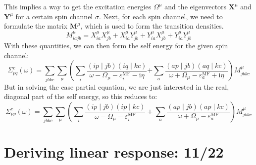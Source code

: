 This implies a way to get the excitation energies $\Omega^\mu$ and the eigenvectors $\mathbf{X}^\mu$ and $\mathbf{Y}^\mu$ for a certain spin channel $\sigma $. Next, for each spin channel, we need to formulate the matrix $\mathbf{M}^{\mu }$, which is used to form the transition densities.
\begin{equation}
M_{i a j b}^{\mu }=X_{i a}^{\mu } X_{j b}^{\mu }+X_{i a}^{\mu } Y_{j b}^{\mu }+Y_{i a}^{\mu } X_{j b}^{\mu }+Y_{i a}^{\mu } Y_{j b}^{\mu }
\end{equation}
With these quantities, we can then form the self energy for the given spin channel:
\begin{equation}
\Sigma_{p q}^c\left(\omega \right)= \sum_{j b k c} \sum_{\mu }\left(\sum_i \frac{(i p \mid j b)(i q \mid k c)}{\omega -\Omega_{\mu }-\varepsilon_i^{\mathrm{MF}}-\mathrm{i} \eta}\right.
\left.+\sum_a \frac{(a p \mid j b)(a q \mid k c)}{\omega +\Omega_{\mu }-\varepsilon_a^{\mathrm{MF}}+\mathrm{i} \eta}\right) M_{j b k c}^{\mu }
\label{eq:Sigma}
\end{equation}
But in solving the case partial equation, we are just interested in the real, diagonal part of the self energy, so this reduces to:
\begin{equation}
\Sigma_{p p}^c\left(\omega \right)= \sum_{j b k c} \sum_{\mu }\left(\sum_i \frac{(i p \mid j b)(i p \mid k c)}{\omega -\Omega_{\mu }-\varepsilon_i^{\mathrm{MF}}} + \sum_a \frac{(a p \mid j b)(a p \mid k c)}{\omega +\Omega_{\mu }-\varepsilon_a^{\mathrm{MF}}}\right) M_{j b k c}^{\mu }
\end{equation}

\section{Deriving linear response: 11/22}
